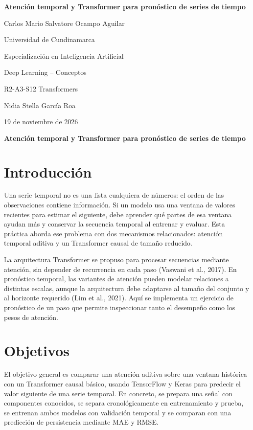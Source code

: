 \documentclass[12pt]{article}
\newcommand{\student}{Carlos Mario Salvatore Ocampo Aguilar}
\begin{document}
\begin{titlepage}
\thispagestyle{empty}
\centering
\vspace*{1.35in}
{\bfseries Atención temporal y Transformer para pronóstico de series de tiempo\par}
\vspace{1.2in}
\student\par
Universidad de Cundinamarca\par
Especialización en Inteligencia Artificial\par
Deep Learning -- Conceptos\par
R2-A3-S12 Transformers\par
Nidia Stella García Roa\par
19 de noviembre de 2026\par
\vfill
\end{titlepage}
\setcounter{page}{2}

\begin{center}
\textbf{Atención temporal y Transformer para pronóstico de series de tiempo}
\end{center}

\section{Introducción}
Una serie temporal no es una lista cualquiera de números: el orden de las observaciones contiene información. Si un modelo usa una ventana de valores recientes para estimar el siguiente, debe aprender qué partes de esa ventana ayudan más y conservar la secuencia temporal al entrenar y evaluar. Esta práctica aborda ese problema con dos mecanismos relacionados: atención temporal aditiva y un Transformer causal de tamaño reducido.

La arquitectura Transformer se propuso para procesar secuencias mediante atención, sin depender de recurrencia en cada paso (Vaswani et al., 2017). En pronóstico temporal, las variantes de atención pueden modelar relaciones a distintas escalas, aunque la arquitectura debe adaptarse al tamaño del conjunto y al horizonte requerido (Lim et al., 2021). Aquí se implementa un ejercicio de pronóstico de un paso que permite inspeccionar tanto el desempeño como los pesos de atención.

\section{Objetivos}
El objetivo general es comparar una atención aditiva sobre una ventana histórica con un Transformer causal básico, usando TensorFlow y Keras para predecir el valor siguiente de una serie temporal. En concreto, se prepara una señal con componentes conocidos, se separa cronológicamente en entrenamiento y prueba, se entrenan ambos modelos con validación temporal y se comparan con una predicción de persistencia mediante MAE y RMSE.
\end{document}
